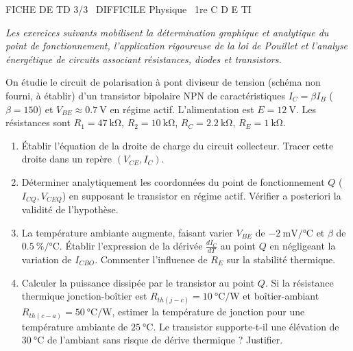 \documentclass[11pt]{article}
\begin{document}
\begin{tcolorbox}[enhanced,colback=popink,colframe=popink,arc=10pt,boxrule=0pt,left=12pt,right=12pt,top=9pt,bottom=9pt]
{\color{white}\popxbold\small FICHE DE TD 3/3 \textbullet\ DIFFICILE \hfill Physique \textbullet\ 1re C D E TI\par}
\end{tcolorbox}
\vspace{4pt}
\noindent \textit{Les exercices suivants mobilisent la détermination graphique et analytique du point de fonctionnement, l'application rigoureuse de la loi de Pouillet et l'analyse énergétique de circuits associant résistances, diodes et transistors.}

\begin{exercice}
On étudie le circuit de polarisation à pont diviseur de tension (schéma non fourni, à établir) d'un transistor bipolaire NPN de caractéristiques $I_C = \beta I_B$ ($\beta = 150$) et $V_{BE} \approx \SI{0,7}{\volt}$ en régime actif. L'alimentation est $E = \SI{12}{\volt}$. Les résistances sont $R_1 = \SI{47}{\kilo\ohm}$, $R_2 = \SI{10}{\kilo\ohm}$, $R_C = \SI{2,2}{\kilo\ohm}$, $R_E = \SI{1}{\kilo\ohm}$.
\begin{enumerate}
    \item Établir l'équation de la droite de charge du circuit collecteur. Tracer cette droite dans un repère $(V_{CE}, I_C)$.
    \item Déterminer analytiquement les coordonnées du point de fonctionnement $Q$ ($I_{CQ}, V_{CEQ}$) en supposant le transistor en régime actif. Vérifier a posteriori la validité de l'hypothèse.
    \item La température ambiante augmente, faisant varier $V_{BE}$ de $\SI{-2}{\milli\volt\per\celsius}$ et $\beta$ de $\SI{+0,5}{\percent\per\celsius}$. Établir l'expression de la dérivée $\frac{dI_C}{dT}$ au point $Q$ en négligeant la variation de $I_{CBO}$. Commenter l'influence de $R_E$ sur la stabilité thermique.
    \item Calculer la puissance dissipée par le transistor au point $Q$. Si la résistance thermique jonction-boîtier est $R_{th(j-c)} = \SI{10}{\celsius\per\watt}$ et boîtier-ambiant $R_{th(c-a)} = \SI{50}{\celsius\per\watt}$, estimer la température de jonction pour une température ambiante de $\SI{25}{\degreeCelsius}$. Le transistor supporte-t-il une élévation de $\SI{30}{\celsius}$ de l'ambiant sans risque de dérive thermique ? Justifier.
\end{enumerate}
\end{exercice}
\end{document}
